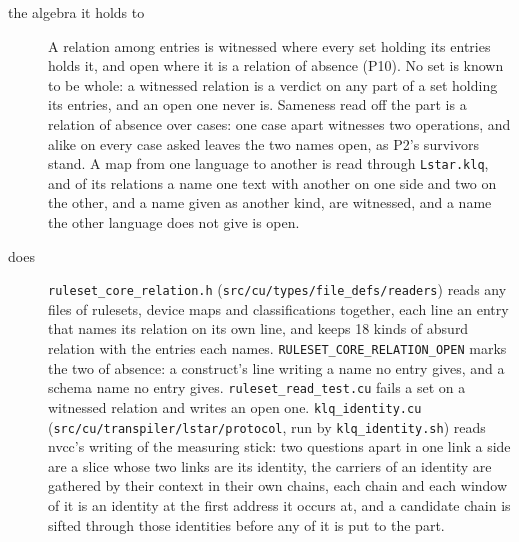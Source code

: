 \begin{description}
\item[{the algebra it holds to}] A relation among entries is witnessed where every set holding its entries holds it, and open where it is a relation of absence (P10). No set is known to be whole: a witnessed relation is a verdict on any part of a set holding its entries, and an open one never is. Sameness read off the part is a relation of absence over cases: one case apart witnesses two operations, and alike on every case asked leaves the two names open, as P2's survivors stand. A map from one language to another is read through \texttt{Lstar.\allowbreak{}klq}, and of its relations a name one text with another on one side and two on the other, and a name given as another kind, are witnessed, and a name the other language does not give is open.
\item[{does}] \texttt{ruleset\_\allowbreak{}core\_\allowbreak{}relation.\allowbreak{}h} (\texttt{src/\allowbreak{}cu/\allowbreak{}types/\allowbreak{}file\_\allowbreak{}defs/\allowbreak{}readers}) reads any files of rulesets, device maps and classifications together, each line an entry that names its relation on its own line, and keeps 18 kinds of absurd relation with the entries each names. \texttt{RULESET\_\allowbreak{}CORE\_\allowbreak{}RELATION\_\allowbreak{}OPEN} marks the two of absence: a construct's line writing a name no entry gives, and a schema name no entry gives. \texttt{ruleset\_\allowbreak{}read\_\allowbreak{}test.\allowbreak{}cu} fails a set on a witnessed relation and writes an open one. \texttt{klq\_\allowbreak{}identity.\allowbreak{}cu} (\texttt{src/\allowbreak{}cu/\allowbreak{}transpiler/\allowbreak{}lstar/\allowbreak{}protocol}, run by \texttt{klq\_\allowbreak{}identity.\allowbreak{}sh}) reads nvcc's writing of the measuring stick: two questions apart in one link a side are a slice whose two links are its identity, the carriers of an identity are gathered by their context in their own chains, each chain and each window of it is an identity at the first address it occurs at, and a candidate chain is sifted through those identities before any of it is put to the part.

\end{description}
